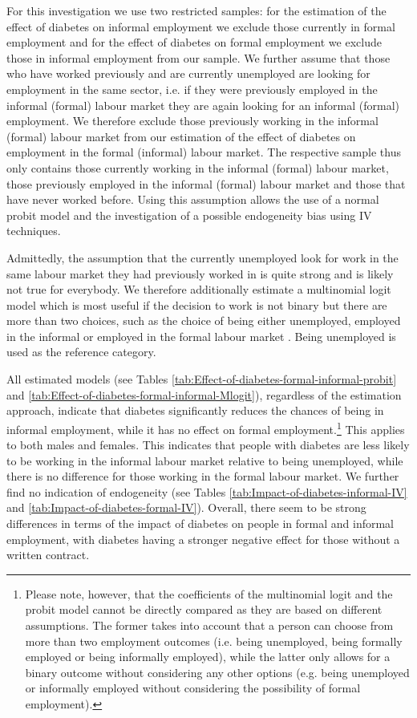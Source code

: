 For this investigation we use two restricted samples: for the estimation
of the effect of diabetes on informal employment we exclude those
currently in formal employment and for the effect of diabetes on formal
employment we exclude those in informal employment from our sample.
We further assume that those who have worked previously and are currently
unemployed are looking for employment in the same sector, i.e. if
they were previously employed in the informal (formal) labour market
they are again looking for an informal (formal) employment. We therefore
exclude those previously working in the informal (formal) labour market
from our estimation of the effect of diabetes on employment in the
formal (informal) labour market. The respective sample thus only contains
those currently working in the informal (formal) labour market, those
previously employed in the informal (formal) labour market and those
that have never worked before. Using this assumption allows the use
of a normal probit model and the investigation of a possible endogeneity
bias using \ac{IV} techniques. 


Admittedly, the assumption that the currently unemployed look for
work in the same labour market they had previously worked in is quite
strong and is likely not true for everybody. We therefore additionally
estimate a multinomial logit model which is most useful if the decision
to work is not binary but there are more than two choices, such as
the choice of being either unemployed, employed in the informal or
employed in the formal labour market \parencite{Wooldridge2002}. Being
unemployed is used as the reference category.

All estimated models (see Tables \ref{tab:Effect-of-diabetes-formal-informal-probit}
and \ref{tab:Effect-of-diabetes-formal-informal-Mlogit}), regardless
of the estimation approach,  indicate that diabetes significantly
reduces the chances of being in informal employment, while it has
no effect on formal employment.\footnote{Please note, however, that the coefficients of the multinomial logit
and the probit model cannot be directly compared as they are based
on different assumptions. The former takes into account that a person
can choose from more than two employment outcomes (i.e. being unemployed,
being formally employed or being informally employed), while the latter
only allows for a binary outcome without considering any other options
(e.g. being unemployed or informally employed without considering
the possibility of formal employment).} This applies to both males and females. This indicates that people
with diabetes are less likely to be working in the informal labour
market relative to being unemployed, while there is no difference
for those working in the formal labour market. We further find no
indication of endogeneity (see Tables \ref{tab:Impact-of-diabetes-informal-IV}
and \ref{tab:Impact-of-diabetes-formal-IV}). Overall,
there seem to be strong differences in terms of the impact of diabetes
on people in formal and informal employment, with diabetes having
a stronger negative effect for those without a written contract.


